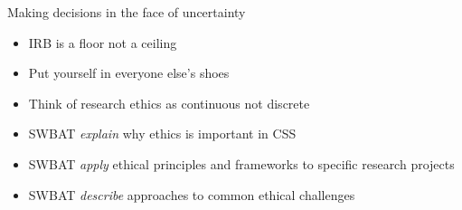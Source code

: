 \documentclass{beamer}
\newcommand{\goals}{
\begin{itemize}
\item SWBAT \emph{explain} why ethics is important in CSS
\item SWBAT \emph{apply} ethical principles and frameworks to specific research projects
\item SWBAT \emph{describe} approaches to common ethical challenges
\end{itemize}
}
\begin{document}
\begin{frame}

Making decisions in the face of uncertainty

\end{frame}
\begin{frame}

\begin{itemize}
\item IRB is a floor not a ceiling
\pause
\item Put yourself in everyone else's shoes
\pause
\item Think of research ethics as continuous not discrete
\end{itemize}

\end{frame}
\begin{frame}

\goals

\end{frame}


\end{document}
